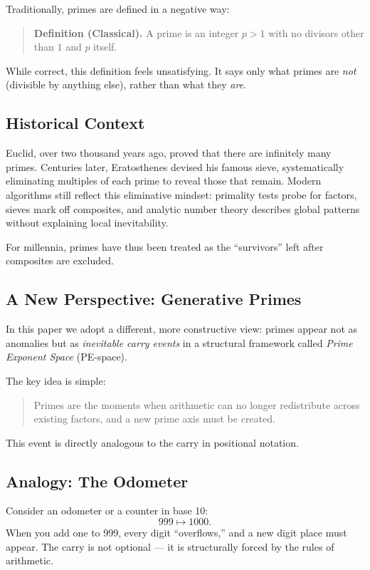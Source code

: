 \documentclass[11pt]{article}
\theoremstyle{definition}
\begin{document}
Traditionally, primes are defined in a negative way:

\begin{quote}
\textbf{Definition (Classical).} A prime is an integer $p > 1$ with no divisors other than $1$ and $p$ itself.
\end{quote}

While correct, this definition feels unsatisfying. It says only what primes are \emph{not} 
(divisible by anything else), rather than what they \emph{are}. 

\subsection*{Historical Context}
Euclid, over two thousand years ago, proved that there are infinitely many primes. 
Centuries later, Eratosthenes devised his famous sieve, systematically eliminating multiples 
of each prime to reveal those that remain. Modern algorithms still reflect this eliminative 
mindset: primality tests probe for factors, sieves mark off composites, and analytic number 
theory describes global patterns without explaining local inevitability. 

For millennia, primes have thus been treated as the “survivors” left after composites are excluded. 

\subsection*{A New Perspective: Generative Primes}
In this paper we adopt a different, more constructive view: 
primes appear not as anomalies but as \emph{inevitable carry events} in a structural framework 
called \emph{Prime Exponent Space} (PE-space). 

The key idea is simple:

\begin{quote}
Primes are the moments when arithmetic can no longer redistribute across existing factors, 
and a new prime axis must be created.
\end{quote}

This event is directly analogous to the carry in positional notation. 

\subsection*{Analogy: The Odometer}
Consider an odometer or a counter in base 10:
\[
999 \longmapsto 1000.
\]
When you add one to 999, every digit “overflows,” and a new digit place must appear. 
The carry is not optional --- it is structurally forced by the rules of arithmetic. 
\end{document}
